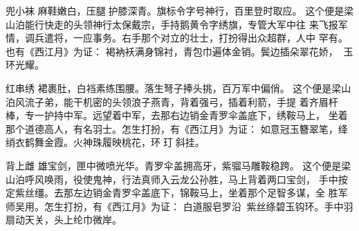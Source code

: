 兜小袜
麻鞋嫩白，压腿护膝深青。旗标令字号神行，百里登时取应。
这个便是梁山泊能行快走的头领神行太保戴宗，手持鹅黄令字绣旗，专管大军中往
来飞报军情，调兵遣将，一应事务。右手那个对立的壮士，打扮得出众超群，人中
罕有。也有《西江月》为证：
褐衲袄满身锦衬，青包巾遍体金销。鬓边插朵翠花娇，玉环光耀。

红串绣
裙裹肚，白裆素练围腰。落生弩子捧头挑，百万军中偏俏。
这个便是梁山泊风流子弟，能干机密的头领浪子燕青，背着强弓，插着利箭，手提
着齐眉杆棒，专一护持中军。远望着中军，去那右边销金青罗伞盖底下，绣鞍马上，
坐着那个道德高人，有名羽士。怎生打扮，有《西江月》为证：
如意冠玉簪翠笔，绛绡衣鹤舞金霞。火神珠履映桃花，环玎斜挂。

背上雌
雄宝剑，匣中微喷光华。青罗伞盖拥高牙，紫骝马雕鞍稳跨。
这个便是梁山泊呼风唤雨，役使鬼神，行法真师入云龙公孙胜，马上背着两口宝剑，
手中按定紫丝缰。去那左边销金青罗伞盖底下，锦鞍马上，坐着那个足智多谋，全
胜军师吴用。怎生打扮，有《西江月》为证：
白道服皂罗沿，紫丝绦碧玉钩环。手中羽扇动天关，头上纶巾微岸。


